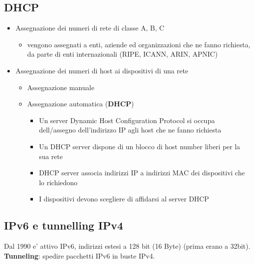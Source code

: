 \documentclass[a4paper,12pt]{article}
\begin{document}
\subsection{DHCP}
\begin{itemize}
  \item Assegnazione dei numeri di rete di classe A, B, C
  \begin{itemize}
    \item vengono assegnati a enti, aziende ed organizzazioni che ne fanno richiesta, da parte di enti internazionali (RIPE, ICANN, ARIN, APNIC)
  \end{itemize}
  \item Assegnazione dei numeri di host ai dispositivi di una rete
  \begin{itemize}
    \item Assegnazione manuale
    \item Assegnazione automatica (\textbf{DHCP})
    \begin{itemize}
      \item Un server Dynamic Host Configuration Protocol si occupa dell/assegno dell’indirizzo IP agli host che ne fanno richiesta
      \item Un DHCP server dispone di un blocco di host number liberi per la sua rete
      \item DHCP server associa indirizzi IP a indirizzi MAC dei dispositivi che lo richiedono
      \item I dispositivi devono scegliere di affidarsi al server DHCP
    \end{itemize}
  \end{itemize}
\end{itemize}
\subsection{IPv6 e tunnelling IPv4}
Dal 1990 e' attivo IPv6, indirizzi estesi a 128 bit (16 Byte) (prima erano a 32bit). \\
\textbf{Tunneling}: spedire pacchetti IPv6 in buste IPv4.
\end{document}
